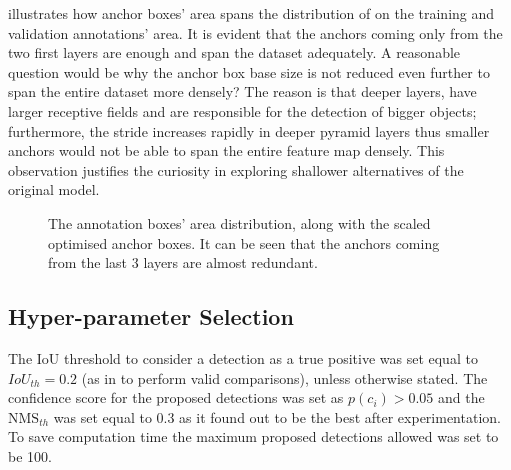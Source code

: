   illustrates how anchor boxes' area spans the distribution of on the training and validation annotations' area. It is evident that the anchors coming only from the two first layers are enough and span the dataset adequately. A reasonable question would be why the anchor box base size is not reduced even further to span the entire dataset more densely? The reason is that deeper layers, have larger receptive fields and are responsible for the detection of bigger objects; furthermore, the stride increases rapidly in deeper pyramid layers thus smaller anchors would not be able to span the entire feature map densely. This observation justifies the curiosity in exploring shallower alternatives of the original model.
 
\begin{figure}[!htb]
  \centering
  \caption{The annotation boxes' area distribution, along with the scaled optimised anchor boxes. It can be seen that the anchors coming from the last 3 layers are almost redundant.}
  \label{fig1}
\end{figure}

\subsection{Hyper-parameter Selection}
The IoU threshold to consider a detection as a true positive was set equal to $IoU_{th} = 0.2$ (as in \cite{bargoti2017deep} to perform valid comparisons), unless otherwise stated. The confidence score for the proposed detections was set as $p(c_i) > 0.05$ and the $\text{NMS}_{th}$ was set equal to 0.3 as it found out to be the best after experimentation. To save computation time the maximum proposed detections allowed was set to be 100. 


